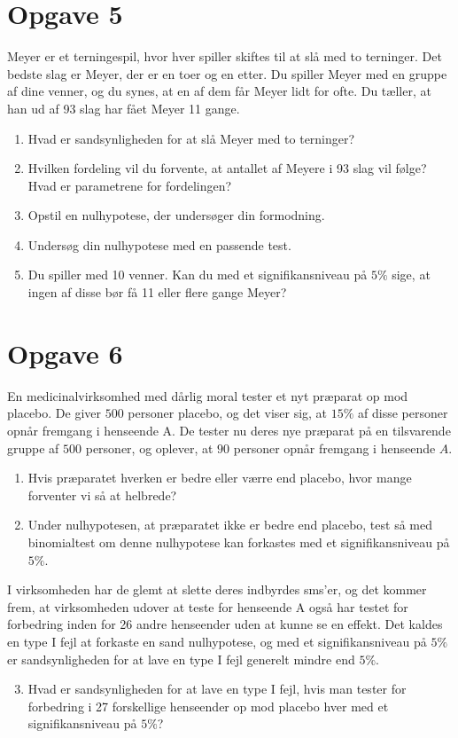 \section*{Opgave 5}
Meyer er et terningespil, hvor hver spiller skiftes til at slå med to terninger. Det bedste slag er Meyer, der er en toer og en etter. Du spiller Meyer med en gruppe af dine venner, og du synes, at en af dem får Meyer lidt for ofte. Du tæller, at han ud af 93 slag har fået Meyer 11 gange.
\begin{enumerate}[label=\roman*)]
\item Hvad er sandsynligheden for at slå Meyer med to terninger?
\item Hvilken fordeling vil du forvente, at antallet af Meyere i 93 slag vil følge? Hvad er parametrene for fordelingen?
\item Opstil en nulhypotese, der undersøger din formodning.
\item Undersøg din nulhypotese med en passende test. 
\item Du spiller med 10 venner. Kan du med et signifikansniveau på $5\%$ sige, at ingen af disse bør få 11 eller flere gange Meyer?
\end{enumerate}

\section*{Opgave 6}
En medicinalvirksomhed med dårlig moral tester et nyt præparat op mod placebo. De giver $500$ personer placebo, og det viser sig, at $15\%$ af disse personer opnår fremgang i henseende A. De tester nu deres nye præparat på en tilsvarende gruppe af $500$ personer, og oplever, at $90$ personer opnår fremgang i henseende $A$. 
\begin{enumerate}[label=\roman*)]
\item Hvis præparatet hverken er bedre eller værre end placebo, hvor mange forventer vi så at helbrede?
\item Under nulhypotesen, at præparatet ikke er bedre end placebo, test så med binomialtest om denne nulhypotese kan forkastes med et signifikansniveau på $5\%$.
\end{enumerate}
I virksomheden har de glemt at slette deres indbyrdes sms'er, og det kommer frem, at virksomheden udover at teste for henseende A også har testet for forbedring inden for 26 andre henseender uden at kunne se en effekt. Det kaldes en type I fejl at forkaste en sand nulhypotese, og med et signifikansniveau på $5\%$ er sandsynligheden for at lave en type I fejl generelt mindre end $5\%$. 
\begin{enumerate}[label=\roman*)]
\setcounter{enumi}{2}
\item Hvad er sandsynligheden for at lave en type I fejl, hvis man tester for forbedring i 27 forskellige henseender op mod placebo hver med et signifikansniveau på $5\%$?
\end{enumerate}

